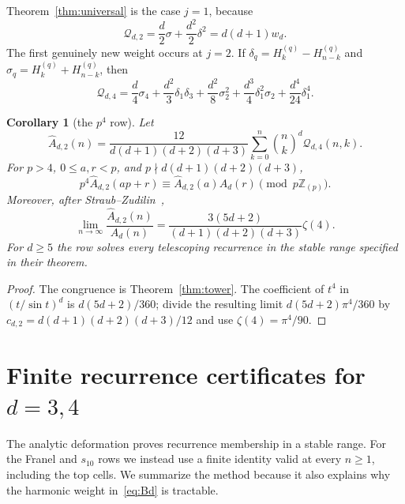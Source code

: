 \documentclass[11pt,reqno]{amsart}
\newtheorem{corollary}[theorem]{Corollary}
\theoremstyle{definition}
\theoremstyle{remark}
\newcommand{\Zp}{\mathbb Z_{(p)}}
\begin{document}
Theorem~\ref{thm:universal} is the case $j=1$, because
\[
 \mathcal Q_{d,2}=\frac d2\sigma+\frac{d^2}{2}\delta^2
 =d(d+1)w_d.
\]
The first genuinely new weight occurs at $j=2$.  If
$\delta_q=H_k^{(q)}-H_{n-k}^{(q)}$ and
$\sigma_q=H_k^{(q)}+H_{n-k}^{(q)}$, then
\begin{equation}\label{eq:Q4}
 \mathcal Q_{d,4}
 =\frac d4\sigma_4+\frac{d^2}{3}\delta_1\delta_3
  +\frac{d^2}{8}\sigma_2^2+\frac{d^3}{4}\delta_1^2\sigma_2
  +\frac{d^4}{24}\delta_1^4.
\end{equation}

\begin{corollary}[the $p^4$ row]\label{cor:p4}
Let
\[
 \widehat A_{d,2}(n)=
 \frac{12}{d(d+1)(d+2)(d+3)}
 \sum_{k=0}^n\binom nk^d\mathcal Q_{d,4}(n,k).
\]
For $p>4$, $0\leq a,r<p$, and
$p\nmid d(d+1)(d+2)(d+3)$,
\[
 p^4\widehat A_{d,2}(ap+r)
 \equiv\widehat A_{d,2}(a)A_d(r)\pmod {p\Zp}.
\]
Moreover, after Straub--Zudilin~\cite{StraubZudilin},
\begin{equation}\label{eq:zeta4limit}
 \lim_{n\to\infty}\frac{\widehat A_{d,2}(n)}{A_d(n)}
 =\frac{3(5d+2)}{(d+1)(d+2)(d+3)}\zeta(4).
\end{equation}
For $d\geq5$ the row solves every telescoping recurrence in the stable range
specified in their theorem.
\end{corollary}

\begin{proof}
The congruence is Theorem~\ref{thm:tower}.  The coefficient of $t^4$ in
$(t/\sin t)^d$ is $d(5d+2)/360$; divide the resulting limit
$d(5d+2)\pi^4/360$ by
$c_{d,2}=d(d+1)(d+2)(d+3)/12$ and use $\zeta(4)=\pi^4/90$.
\end{proof}

\section{Finite recurrence certificates for \texorpdfstring{$d=3,4$}{d=3,4}}

The analytic deformation proves recurrence membership in a stable range.  For
the Franel and $s_{10}$ rows we instead use a finite identity valid at every
$n\geq1$, including the top cells.  We summarize the method because it also
explains why the harmonic weight in~\eqref{eq:Bd} is tractable.
\end{document}
